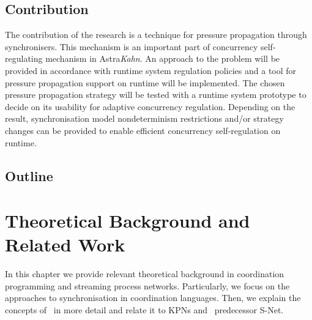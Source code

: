 


    \section{Contribution}
The contribution of the research is a technique for pressure propagation through synchronisers. This mechanism is an important part of concurrency self-regulating mechanism in Astra\emph{Kahn}. An approach to the problem will be provided in accordance with runtime system regulation policies and a tool for pressure propagation support on runtime will be implemented. The chosen pressure propagation strategy will be tested with a runtime system prototype to decide on its usability for adaptive concurrency regulation. Depending on the result, synchronisation model nondeterminism restrictions and/or strategy changes can be provided to enable efficient concurrency self-regulation on runtime.


    \section{Outline}


\chapter{Theoretical Background and Related Work}
In this chapter we provide relevant theoretical background in coordination programming and streaming process networks. Particularly, we focus on the approaches to synchronisation in coordination languages. Then, we explain the concepts of \ak\ in more detail and relate it to KPNs and \ak\ predecessor S-Net.


